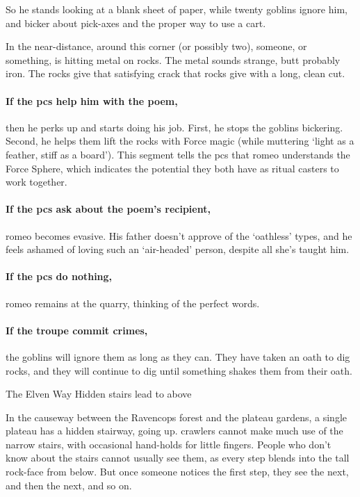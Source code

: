 \begin{multicols}{2}
So he stands looking at a blank sheet of paper, while twenty goblins ignore him, and bicker about pick-axes and the proper way to use a cart.

\begin{boxtext}
  In the near-distance, around this corner (or possibly two), someone, or something, is hitting metal on rocks.
  The metal sounds strange, butt probably iron.
  The rocks give that satisfying crack that rocks give with a long, clean cut.
\end{boxtext}

\paragraph{If the \glspl{pc} help him with the poem,}
then he perks up and starts doing his job.
First, he stops the goblins bickering.
Second, he helps them lift the rocks with Force magic (while muttering `light as a feather, stiff as a board').
This \gls{segment} tells the \glspl{pc} that \gls{romeo} understands the Force Sphere, which indicates the potential they both have as ritual casters to work together.

\paragraph{If the \glspl{pc} ask about the poem's recipient,}
\gls{romeo} becomes evasive.
His father doesn't approve of the `oathless' types, and he feels ashamed of loving such an `air-headed' person, despite all she's taught him.

\paragraph{If the \glspl{pc} do nothing,}
\gls{romeo} remains at the quarry, thinking of the perfect words.

\paragraph{If the troupe commit crimes,}
the goblins will ignore them as long as they can.
They have taken an oath to dig rocks, and they will continue to dig until something shakes them from their oath.


{The Elven Way}%
{Hidden stairs lead to  above}%


In the causeway between the Ravencops forest and the plateau gardens, a single plateau has a hidden stairway, going up.
\Glspl{crawler} cannot make much use of the narrow stairs, with occasional hand-holds for little fingers.
People who don't know about the stairs cannot usually see them, as every step blends into the tall rock-face from below.
But once someone notices the first step, they see the next, and then the next, and so on.


\end{multicols}
